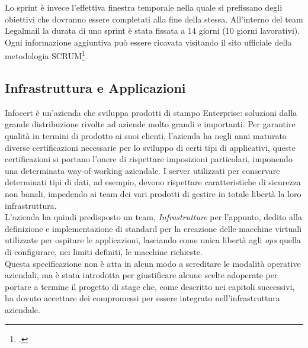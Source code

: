 Lo sprint è invece l'effettiva finestra temporale nella quale si prefissano degli obiettivi che dovranno essere completati alla fine della stessa. All'interno del team Legalmail la durata di uno sprint è stata fissata a 14 giorni (10 giorni lavorativi). \\
Ogni informazione aggiuntiva può essere ricavata visitando il sito ufficiale della metodologia SCRUM\footcite{site:scrum}.
\subsection{Infrastruttura e Applicazioni}
\label{subsec:infra}
Infocert è un'azienda che sviluppa prodotti di stampo Enterprise: soluzioni dalla grande distribuzione rivolte ad aziende molto grandi e importanti. Per garantire qualità in termini di prodotto ai suoi clienti, l'azienda ha negli anni maturato diverse certificazioni necessarie per lo sviluppo di certi tipi di applicativi, queste certificazioni si portano l'onere di rispettare imposizioni particolari, imponendo una determinata \gls{way-of-working} aziendale.
I server utilizzati per conservare determinati tipi di dati, ad esempio, devono rispettare caratteristiche di sicurezza non banali, impedendo ai team dei vari prodotti di gestire in totale libertà la loro infrastruttura. \\
L'azienda ha quindi predisposto un team, \textit{Infrastrutture} per l'appunto, dedito alla definizione e implementazione di standard per la creazione delle macchine virtuali utilizzate per ospitare le applicazioni, lasciando come unica libertà agli \textit{ops} quella di configurare, nei limiti definiti, le macchine richieste. \\
Questa specificazione non è atta in alcun modo a screditare le modalità operative aziendali, ma è stata introdotta per giustificare alcune scelte adoperate per portare a termine il progetto di stage che, come descritto nei capitoli successivi, ha dovuto accettare dei compromessi per essere integrato nell'infrastruttura aziendale.
